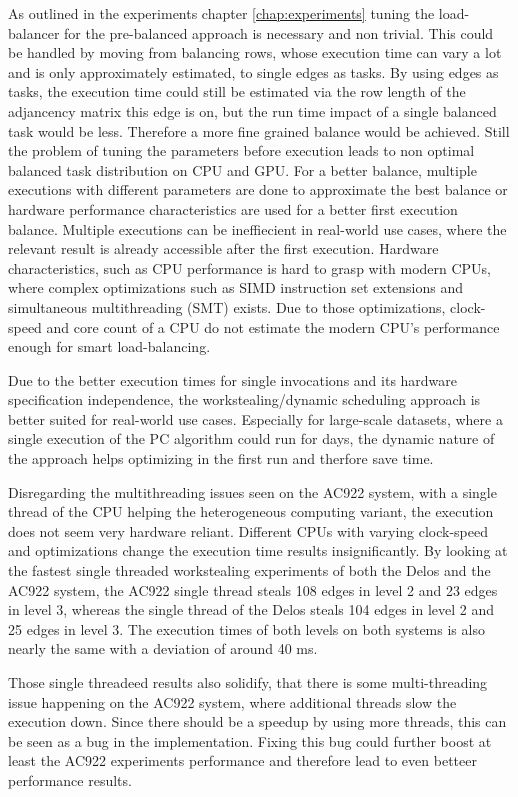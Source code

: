 As outlined in the experiments chapter \ref{chap:experiments} tuning the load-balancer for the pre-balanced approach is necessary and non trivial. This could be handled by moving from balancing rows, whose execution time can vary a lot and is only approximately estimated, to single edges as tasks. By using edges as tasks, the execution time could still be estimated via the row length of the adjancency matrix this edge is on, but the run time impact of a single balanced task would be less. Therefore a more fine grained balance would be achieved.
Still the problem of tuning the parameters before execution leads to non optimal balanced task distribution on CPU and GPU. For a better balance, multiple executions with different parameters are done to approximate the best balance or hardware performance characteristics are used for a better first execution balance. Multiple executions can be ineffiecient in real-world use cases, where the relevant result is already accessible after the first execution. Hardware characteristics, such as CPU performance is hard to grasp with modern CPUs, where complex optimizations such as SIMD instruction set extensions and simultaneous multithreading (SMT) exists. Due to those optimizations, clock-speed and core count of a CPU do not estimate the modern CPU's performance enough for smart load-balancing.

Due to the better execution times for single invocations and its hardware specification independence, the workstealing/dynamic scheduling approach is better suited for real-world use cases. Especially for large-scale datasets, where a single execution of the PC algorithm could run for days, the dynamic nature of the approach helps optimizing in the first run and therfore save time.

Disregarding the multithreading issues seen on the AC922 system, with a single thread of the CPU helping the heterogeneous computing variant, the execution does not seem very hardware reliant. Different CPUs with varying clock-speed and optimizations change the execution time results insignificantly. By looking at the fastest single threaded workstealing experiments of both the Delos and the AC922 system, the AC922 single thread steals 108 edges in level 2 and 23 edges in level 3, whereas the single thread of the Delos steals 104 edges in level 2 and 25 edges in level 3. The execution times of both levels on both systems is also nearly the same with a deviation of around 40 ms.

Those single threadeed results also solidify, that there is some multi-threading issue happening on the AC922 system, where additional threads slow the execution down. Since there should be a speedup by using more threads, this can be seen as a bug in the implementation. Fixing this bug could further boost at least the AC922 experiments performance and therefore lead to even betteer performance results.

